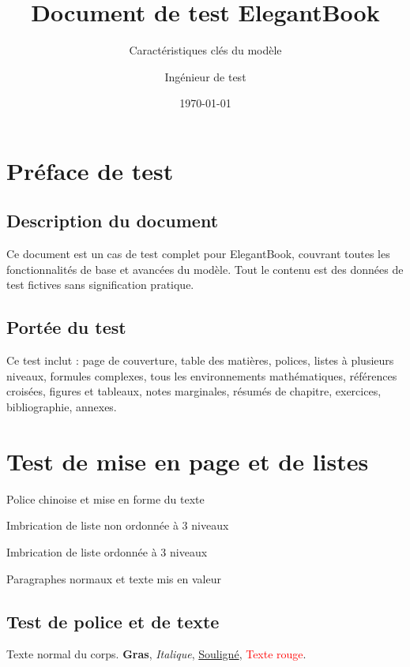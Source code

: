 \documentclass[fr]{../../elegantbook}
\title{Document de test ElegantBook}
\subtitle{Caractéristiques clés du modèle}
\author{Ingénieur de test}
\institute{Équipe de test du modèle}
\date{\today}
\begin{document}
\maketitle
\frontmatter
\tableofcontents

\setcounter{page}{0}
\chapter*{Préface de test}
\section*{Description du document}
Ce document est un cas de test complet pour ElegantBook, couvrant toutes les fonctionnalités de base et avancées du modèle. Tout le contenu est des données de test fictives sans signification pratique.
\newpage
\section*{Portée du test}
Ce test inclut : page de couverture, table des matières, polices, listes à plusieurs niveaux, formules complexes, tous les environnements mathématiques, références croisées, figures et tableaux, notes marginales, résumés de chapitre, exercices, bibliographie, annexes.

\mainmatter

\chapter{Test de mise en page et de listes}
\begin{introduction}
\item Police chinoise et mise en forme du texte
\item Imbrication de liste non ordonnée à 3 niveaux
\item Imbrication de liste ordonnée à 3 niveaux
\item Paragraphes normaux et texte mis en valeur
\end{introduction}

\section{Test de police et de texte}
Texte normal du corps. \textbf{Gras}, \textit{Italique}, \underline{Souligné}, \textcolor{red}{Texte rouge}.
\end{document}
